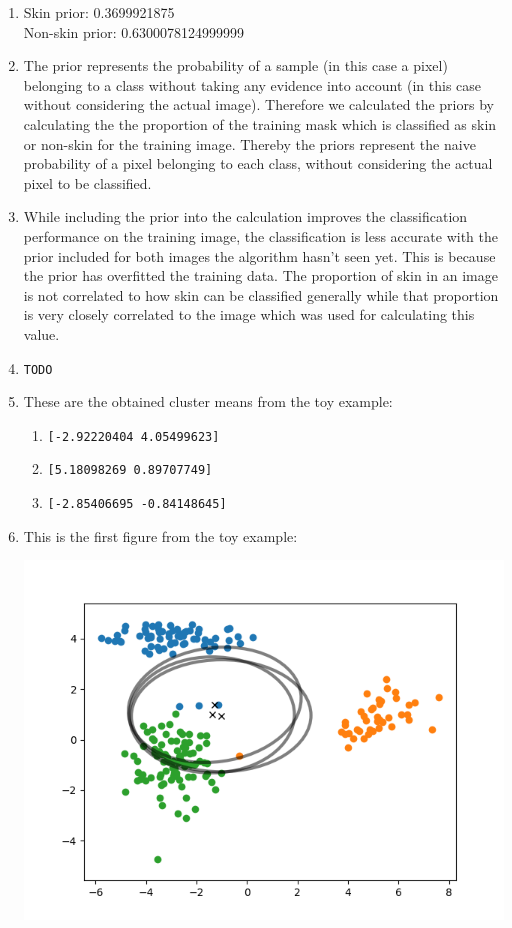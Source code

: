 \documentclass[11pt]{article}
\begin{document}
\begin{enumerate}[1.]
	\item Skin prior: 0.3699921875\\Non-skin prior: 0.6300078124999999
	\item The prior represents the probability of a sample (in this case a pixel) belonging to a class without taking any evidence into account (in this case without considering the actual image). Therefore we calculated the priors by calculating the the proportion of the training mask which is classified as skin or non-skin for the training image. Thereby the priors represent the naive probability of a pixel belonging to each class, without considering the actual pixel to be classified. 
	\item While including the prior into the calculation improves the classification performance on the training image, the classification is less accurate with the prior included for both images the algorithm hasn't seen yet. This is because the prior has overfitted the training data. The proportion of skin in an image is not correlated to how skin can be classified generally while that proportion is very closely correlated to the image which was used for calculating this value.
	\item \texttt{TODO}
	\item These are the obtained cluster means from the toy example:
	\begin{enumerate}[Cluster 1:]
		\item \texttt{[-2.92220404  4.05499623]}
		\item \texttt{[5.18098269 0.89707749]}
		\item \texttt{[-2.85406695 -0.84148645]}
	\end{enumerate}
	\item This is the first figure from the toy example:
	
		\includegraphics[width=6in]{toy_beginning.png}\\
		

\end{enumerate}
\end{document}
